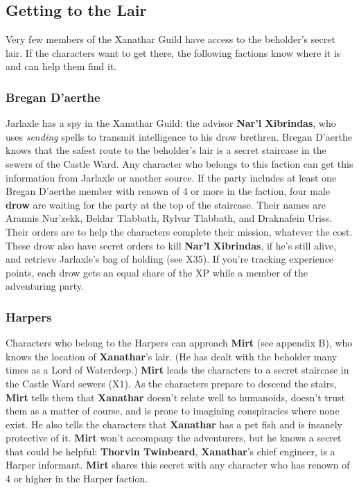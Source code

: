 \documentclass[10pt,a4paper,twoside,twocolumn,openany,nodeprecatedcode]{dndbook}
\begin{document}
\subsection{Getting to the Lair}
Very few members of the Xanathar Guild have access to the beholder's secret lair. If the characters want to get there, the following factions know where it is and can help them find it.
\subsubsection{Bregan D'aerthe}
Jarlaxle has a spy in the Xanathar Guild: the advisor \textbf{Nar'l Xibrindas}, who uses \textit{sending} spells to transmit intelligence to his drow brethren. Bregan D'aerthe knows that the safest route to the beholder's lair is a secret staircase in the sewers of the Castle Ward. Any character who belongs to this faction can get this information from Jarlaxle or another source.
If the party includes at least one Bregan D'aerthe member with renown of 4 or more in the faction, four male \textbf{drow} are waiting for the party at the top of the staircase. Their names are Arannis Nur'zekk, Beldar Tlabbath, Rylvar Tlabbath, and Draknafein Uriss. Their orders are to help the characters complete their mission, whatever the cost. These drow also have secret orders to kill \textbf{Nar'l Xibrindas}, if he's still alive, and retrieve Jarlaxle's bag of holding (see X35). If you're tracking experience points, each drow gets an equal share of the XP while a member of the adventuring party.
\subsubsection{Harpers}
Characters who belong to the Harpers can approach \textbf{Mirt} (see appendix B), who knows the location of \textbf{Xanathar}'s lair. (He has dealt with the beholder many times as a Lord of Waterdeep.)
\textbf{Mirt} leads the characters to a secret staircase in the Castle Ward sewers (X1). As the characters prepare to descend the stairs, \textbf{Mirt} tells them that \textbf{Xanathar} doesn't relate well to humanoids, doesn't trust them as a matter of course, and is prone to imagining conspiracies where none exist. He also tells the characters that \textbf{Xanathar} has a pet fish and is insanely protective of it.
\textbf{Mirt} won't accompany the adventurers, but he knows a secret that could be helpful: \textbf{Thorvin Twinbeard}, \textbf{Xanathar}'s chief engineer, is a Harper informant. \textbf{Mirt} shares this secret with any character who has renown of 4 or higher in the Harper faction.
\end{document}
